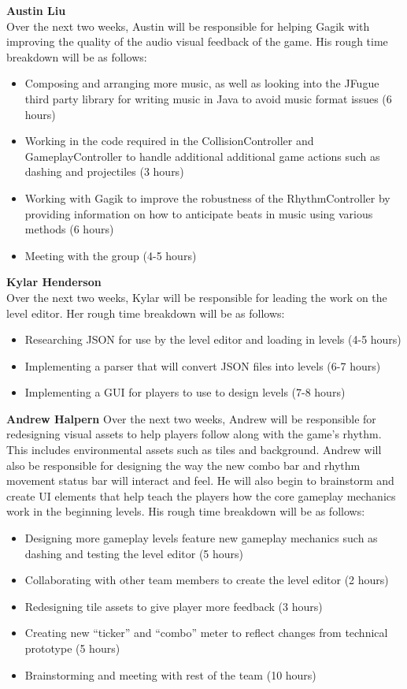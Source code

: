 \documentclass[]{article}
\begin{document}
\noindent
\textbf{Austin Liu}\\
Over the next two weeks, Austin will be responsible for helping Gagik
with improving the quality of the audio visual feedback of the
game. His rough time breakdown will be as follows:
\begin{itemize}
\item Composing and arranging more music, as well as looking into the 
  JFugue third party library for writing music in Java to avoid music format 
  issues (6 hours)
\item Working in the code required in the CollisionController and 
  GameplayController to handle additional additional game actions such 
  as dashing and projectiles (3 hours)
\item Working with Gagik to improve the robustness of the RhythmController 
  by providing information on how to anticipate beats in music using various 
  methods (6 hours)
\item Meeting with the group (4-5 hours)
\end{itemize}

\noindent
\textbf{Kylar Henderson}\\
Over the next two weeks, Kylar will be responsible for leading the
work on the level editor. Her rough time breakdown will be as follows:
\begin{itemize}
\item Researching JSON for use by the level editor and loading in levels 
  (4-5 hours)
\item Implementing a parser that will convert JSON files into levels (6-7 hours)
\item Implementing a GUI for players to use to design levels (7-8 hours)
\end{itemize}

\noindent
\textbf{Andrew Halpern}
Over the next two weeks, Andrew will be responsible for redesigning
visual assets to help players follow along with the game's
rhythm. This includes environmental assets such as tiles and
background. Andrew will also be responsible for designing the way the
new combo bar and rhythm movement status bar will interact and
feel. He will also begin to brainstorm and create UI elements that
help teach the players how the core gameplay mechanics work in the
beginning levels. His rough time breakdown will be as follows:
\begin{itemize}
\item Designing more gameplay levels feature new gameplay mechanics such as 
  dashing and testing the level editor (5 hours)
\item Collaborating with other team members to create the level editor (2 hours)
\item Redesigning tile assets to give player more feedback (3 hours)
\item Creating new ``ticker'' and ``combo'' meter to reflect changes from 
  technical prototype   (5 hours)
\item Brainstorming and meeting with rest of the team (10 hours)
\end{itemize}
\end{document}
